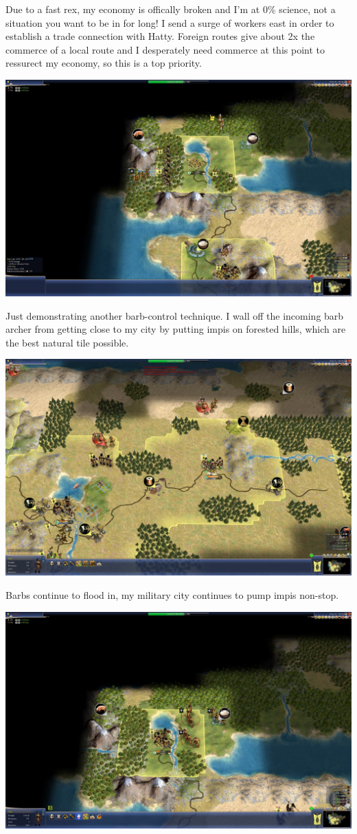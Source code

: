 \documentclass[10pt]{article}
\begin{document}
Due to a fast rex, my economy is offically broken and I'm at 0\% science, not a situation you want to be in
for long! I send a surge of workers east in order to establish a trade connection with Hatty. Foreign routes
give about 2x the commerce of a local route and I desperately need commerce at this point to ressurect my
economy, so this is a top priority.

\includegraphics[width=1.0\textwidth]{59}

Just demonstrating another barb-control technique. I wall off the incoming barb archer from getting close
to my city by putting impis on forested hills, which are the best natural tile possible.

\includegraphics[width=1.0\textwidth]{60}

Barbs continue to flood in, my military city continues to pump impis non-stop.

\includegraphics[width=1.0\textwidth]{62}
\end{document}
